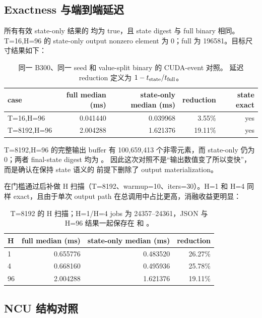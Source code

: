 \subsection{Exactness 与端到端延迟}

所有有效 state-only 结果的  均为 true，且
state digest 与 full binary 相同。T=16,H=96 的 state-only output nonzero
element 为 0；full 为 196581。目标尺寸结果如下：

\begin{table}[htbp]
\centering
\small
\begin{tabular}{l r r r r}
\toprule
case & full median (ms) & state-only median (ms) & reduction & state exact \\
\midrule
T=16,H=96  & 0.041440 & 0.039968 & 3.55\%  & yes \\
T=8192,H=96 & 2.004288 & 1.621376 & 19.11\% & yes \\
\bottomrule
\end{tabular}
\caption{同一 B300、同一 seed 和 value-split binary 的 CUDA-event 对照。
延迟 reduction 定义为 \(1-t_{\rm state}/t_{\rm full}\)。}
\end{table}

T=8192,H=96 的完整输出 buffer 有 100,659,413 个非零元素，而 state-only
仍为 0；两者 final-state digest 均为
。
因此这次对照不是“输出数值变了所以变快”，而是确认在保持 state 语义的
前提下删除了 output materialization。

在门槛通过后补做 H 扫描（T=8192、warmup=10、iters=30）。H=1 和 H=4
同样 exact，且由于单次 output path 在总调用中占比更高，消融收益更明显：

\begin{table}[htbp]
\centering
\small
\begin{tabular}{l r r r}
\toprule
H & full median (ms) & state-only median (ms) & reduction \\
\midrule
1  & 0.655776 & 0.483520 & 26.27\% \\
4  & 0.668160 & 0.495936 & 25.78\% \\
96 & 2.004288 & 1.621376 & 19.11\% \\
\bottomrule
\end{tabular}
\caption{T=8192 的 H 扫描；H=1/H=4 jobs 为 24357--24361，JSON 与 H=96
结果一起保存在  和
。}
\end{table}

\subsection{NCU 结构对照}

